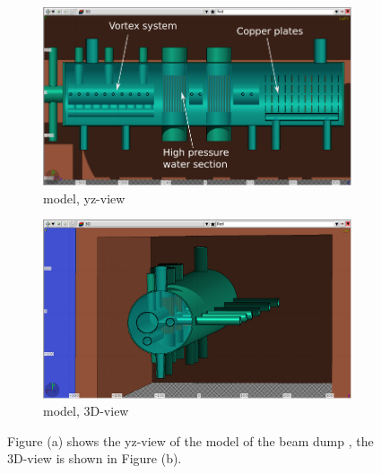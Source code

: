 \begin{figure}[h]
 \centering
  \begin{subfigure}[b]{0.49\textwidth}
   \centering
    \includegraphics[width=\textwidth]{Figures/BeamDump/Design2_geometry_3Dinside3.png}
   \caption{\fluka model, yz-view}
   \end{subfigure}
   \hfill
    \begin{subfigure}[b]{0.49\textwidth}
   \centering
    \includegraphics[width=\textwidth]{Figures/BeamDump/Design2_geometry_3Dinside1.png}
   \caption{\fluka model, 3D-view}
   \end{subfigure}
   \caption[ILC main beam dump design 2]{Figure (a) shows the yz-view of the \fluka model of the beam dump \designtwo, the 3D-view is shown in Figure (b).}
   \label{fig:BeamDumps:design2}
 \end{figure}

